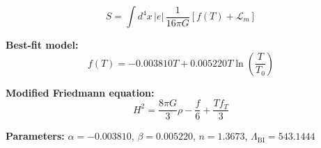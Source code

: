 
\begin{equation}
  S = \int d^4x \, |e| \, \frac{1}{16\pi G} \left[ f(T) + \mathcal{L}_m \right]
\end{equation}

\textbf{Best-fit model:}
\begin{equation}
  f(T) = -0.003810 T + 0.005220 T \ln\!\left(\frac{T}{T_0}\right)
\end{equation}

\textbf{Modified Friedmann equation:}
\begin{equation}
  H^2 = \frac{8\pi G}{3} \rho - \frac{f}{6} + \frac{T f_T}{3}
\end{equation}

\textbf{Parameters:}
$\alpha = -0.003810$, \quad
$\beta = 0.005220$, \quad
$n = 1.3673$, \quad
$\Lambda_{\text{BI}} = 543.1444$